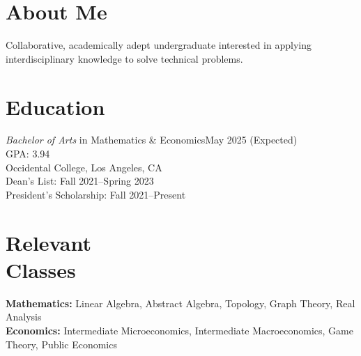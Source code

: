 \documentclass[margin, 10pt]{res} %
\begin{document}
\begin{resume}

\section{\sc About Me}
Collaborative, academically adept undergraduate interested in applying interdisciplinary knowledge to solve technical problems.

\section{\sc Education}

{\sl Bachelor of Arts} in Mathematics \& Economics\hfill May 2025 (Expected) \\
GPA: 3.94\\
Occidental College, Los Angeles, CA \\
Dean's List: Fall 2021--Spring 2023\\
President's Scholarship: Fall 2021--Present
\section{\sc Relevant \\ Classes}

\textbf{Mathematics:} Linear Algebra, Abstract Algebra, Topology, Graph Theory, Real Analysis\\
\textbf{Economics:} Intermediate Microeconomics, Intermediate Macroeconomics, Game Theory, Public Economics

 

\end{resume}
\end{document}
